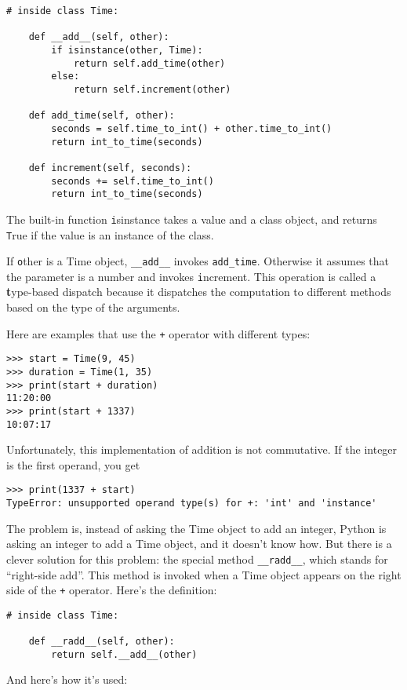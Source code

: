 \documentclass[
DIV=11,
fontsize=12,
twoside,
headinclude=false,
titlepage=firstiscover,
abstract=true,
headsepline=true,
footsepline=true,
chapterprefix=true, %
headings=big,
bibliography=totoc,%
captions=tableheading
]{scrbook}
\theoremstyle{definition}
\begin{document}
\begin{lstlisting}
# inside class Time:

    def __add__(self, other):
        if isinstance(other, Time):
            return self.add_time(other)
        else:
            return self.increment(other)

    def add_time(self, other):
        seconds = self.time_to_int() + other.time_to_int()
        return int_to_time(seconds)

    def increment(self, seconds):
        seconds += self.time_to_int()
        return int_to_time(seconds)
\end{lstlisting}
%
The built-in function {\texttt isinstance} takes a value and a
class object, and returns {\texttt True} if the value is an instance
of the class.

If {\texttt other} is a Time object, \verb"__add__" invokes
\verb"add_time".  Otherwise it assumes that the parameter
is a number and invokes {\texttt increment}.  This operation is
called a {\textbf type-based dispatch} because it dispatches the
computation to different methods based on the type of the
arguments.

Here are examples that use the {\texttt +} operator with different
types:

\begin{lstlisting}
>>> start = Time(9, 45)
>>> duration = Time(1, 35)
>>> print(start + duration)
11:20:00
>>> print(start + 1337)
10:07:17
\end{lstlisting}
%
Unfortunately, this implementation of addition is not commutative.
If the integer is the first operand, you get

\begin{lstlisting}
>>> print(1337 + start)
TypeError: unsupported operand type(s) for +: 'int' and 'instance'
\end{lstlisting}
%
The problem is, instead of asking the Time object to add an integer,
Python is asking an integer to add a Time object, and it doesn't know
how.  But there is a clever solution for this problem: the
special method \verb"__radd__", which stands for ``right-side add''.
This method is invoked when a Time object appears on the right side of
the {\texttt +} operator.  Here's the definition:

\begin{lstlisting}
# inside class Time:

    def __radd__(self, other):
        return self.__add__(other)
\end{lstlisting}
%
And here's how it's used:
\end{document}
